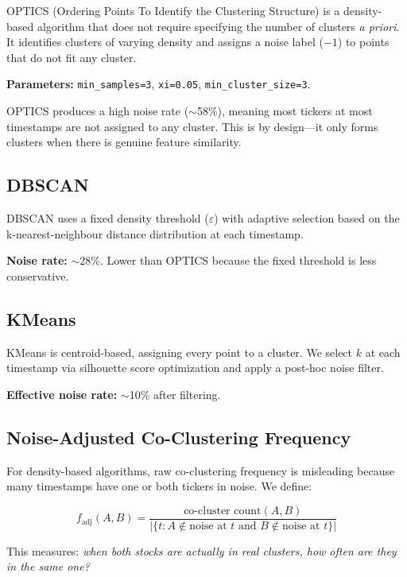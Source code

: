 \documentclass[11pt, a4paper]{article}
\begin{document}
OPTICS (Ordering Points To Identify the Clustering Structure) \cite{ankerst1999} is a density-based algorithm that does not require specifying the number of clusters \textit{a priori}. It identifies clusters of varying density and assigns a noise label ($-1$) to points that do not fit any cluster.

\textbf{Parameters:} \texttt{min\_samples=3}, \texttt{xi=0.05}, \texttt{min\_cluster\_size=3}.

OPTICS produces a high noise rate ($\sim$58\%), meaning most tickers at most timestamps are not assigned to any cluster. This is by design---it only forms clusters when there is genuine feature similarity.

\subsection{DBSCAN}

DBSCAN \cite{ester1996} uses a fixed density threshold ($\varepsilon$) with adaptive selection based on the k-nearest-neighbour distance distribution at each timestamp.

\textbf{Noise rate:} $\sim$28\%. Lower than OPTICS because the fixed threshold is less conservative.

\subsection{KMeans}

KMeans is centroid-based, assigning every point to a cluster. We select $k$ at each timestamp via silhouette score optimization and apply a post-hoc noise filter.

\textbf{Effective noise rate:} $\sim$10\% after filtering.

\subsection{Noise-Adjusted Co-Clustering Frequency}
\label{sec:noise}

For density-based algorithms, raw co-clustering frequency is misleading because many timestamps have one or both tickers in noise. We define:

\[
f_{\text{adj}}(A, B) = \frac{\text{co-cluster count}(A, B)}{|\{t : A \notin \text{noise at } t \text{ and } B \notin \text{noise at } t\}|}
\]

This measures: \textit{when both stocks are actually in real clusters, how often are they in the same one?}
\end{document}
